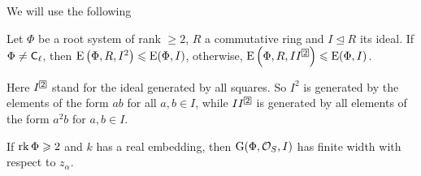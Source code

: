 We will use the following
\begin{lemma}[{\cite[Corollary~3.3]{S}}]
Let $\Phi$ be a root system of rank $\geqslant2$, $R$ a commutative ring and $I\trianglelefteq R$ its ideal. If $\Phi\neq\mathsf{C}_\ell$, then $\operatorname{E}\left(\Phi,R,I^2\right)\leqslant\operatorname{E}(\Phi,I)$, otherwise, $\E\left(\Phi,R,II^{\indexbox{2}}\right)\leqslant\E(\Phi,I)$.
\end{lemma}
Here $I^{\indexbox{2}}$ stand for the ideal generated by all squares. So $I^2$ is generated by the elements of the form $ab$ for all $a,b\in I$, while $II^{\indexbox{2}}$ is generated by all elements of the form $a^2b$ for $a,b\in I$.
\begin{lemma}
If $\operatorname{rk}\Phi\geqslant2$ and $k$ has a real embedding, then $\operatorname{G}(\Phi,\mathcal{O}_S,I)$ has finite width with respect to $z_\alpha$.
\end{lemma}
